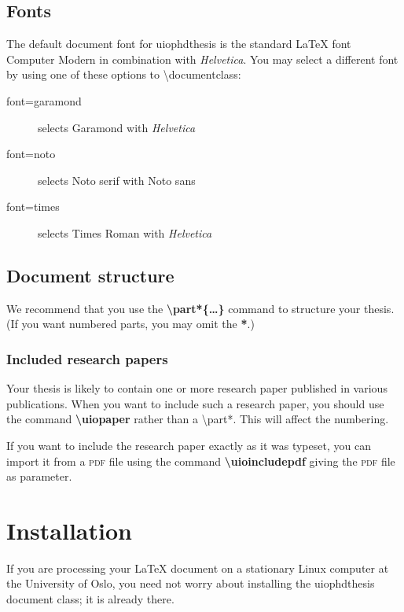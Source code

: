 \documentclass[UKenglish]{uiophdthesis}
\newcommand{\bsl}{\textbackslash}
\newcommand{\p}[1]{\textsf{#1}}
\newcommand{\pb}[1]{\textbf{\p{#1}}}
\newcommand{\pcmd}[1]{\p{\bsl #1}}
\newcommand{\ppar}[1]{\p{\{#1\}}}
\begin{document}
\section{Fonts\label{font}}
The default document font for \p{uiophdthesis} is the standard \LaTeX{} font
{\selectfont Computer Modern} in
combination with \textsf{\textit{Helvetica}}.
You may select a different font by using one of these
options to \pcmd{documentclass}:
\begin{description}
\item[\p{font=garamond}] selects
  {\selectfont Garamond} with
  \textsf{\textit{Helvetica}}
  
\item[\p{font=noto}] selects
  {\selectfont Noto serif} with
  {\selectfont Noto sans}

\item[\p{font=times}] selects
  {\selectfont Times Roman} with
  \textsf{\textit{Helvetica}}
\end{description}

\section{Document structure}
We recommend that you use the \textbf{\pcmd{part*}\ppar{\dots}}
command to structure your thesis. (If you want numbered parts, you may
omit the \pb{*}.)

\subsection{Included research papers}
Your thesis is likely to contain one or more research paper published
in various publications. When you want to include such a research
paper, you should use the command \textbf{\pcmd{uiopaper}} rather than
a \pcmd{part*}. This will affect the numbering.

If you want to include the research paper exactly as it was typeset,
you can import it from a \textsc{pdf} file using the command
\textbf{\pcmd{uioincludepdf}} giving the \textsc{pdf} file as
parameter. 

\chapter{Installation}
If you are processing your \LaTeX{} document on a stationary Linux
computer at the University of Oslo, you need not worry about
installing the \p{uiophdthesis} document class; it is already there.
\end{document}
